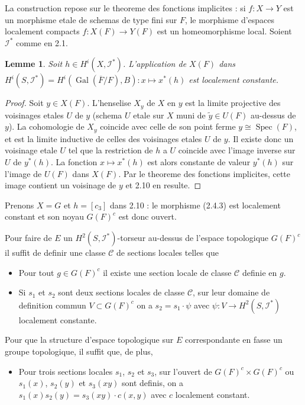 \documentclass[11pt,a4paper]{article}
\theoremstyle{plain}
\newtheorem{lemma}[theorem]{Lemme}
\theoremstyle{definition}
\DeclareMathOperator{\Gal}{Gal}
\DeclareMathOperator{\Spec}{Spec}
\begin{document}
La construction repose sur le theoreme des fonctions implicites : si $f : X \to Y$ est un morphisme etale de schemas de type fini sur $F$, le morphisme d'espaces localement compacts $f : X(F) \to Y(F)$ est un homeomorphisme local. Soient $\mathscr{I}^*$ comme en 2.1.

\begin{lemma}\label{2.10}
Soit $h \in H^i(X, \mathscr{I}^*)$. L'application de $X(F)$ dans $H^i(S, \mathscr{I}^*) = H^i(\Gal(\overline{F}/F), B) : x \mapsto x^*(h)$ est localement constante.
\end{lemma}

\begin{proof}
Soit $y \in X(F)$. L'henselise $X_y$ de $X$ en $y$ est la limite projective des voisinages etales $U$ de $y$ (schema $U$ etale sur $X$ muni de $\tilde{y} \in U(F)$ au-dessus de $y$). La cohomologie de $X_y$ coincide avec celle de son point ferme $y \cong \Spec(F)$, et est la limite inductive de celles des voisinages etales $U$ de $y$. Il existe donc un voisinage etale $U$ tel que la restriction de $h$ a $U$ coincide avec l'image inverse sur $U$ de $y^*(h)$. La fonction $x \mapsto x^*(h)$ est alors constante de valeur $y^*(h)$ sur l'image de $U(F)$ dans $X(F)$. Par le theoreme des fonctions implicites, cette image contient un voisinage de $y$ et 2.10 en resulte.
\end{proof}

Prenons $X = G$ et $h = [c_3]$ dans 2.10 : le morphisme (2.4.3) est localement constant et son noyau $G(F)^c$ est donc ouvert.

Pour faire de $E$ un $H^2(S, \mathscr{I}^*)$-torseur au-dessus de l'espace topologique $G(F)^c$ il suffit de definir une classe $\mathscr{C}$ de sections locales telles que
\begin{itemize}
\item[a)] Pour tout $g \in G(F)^c$ il existe une section locale de classe $\mathscr{C}$ definie en $g$.
\item[b)] Si $s_1$ et $s_2$ sont deux sections locales de classe $\mathscr{C}$, sur leur domaine de definition commun $V \subset G(F)^c$ on a $s_2 = s_1 \cdot \psi$ avec $\psi : V \to H^2(S, \mathscr{I}^*)$ localement constante.
\end{itemize}
Pour que la structure d'espace topologique sur $E$ correspondante en fasse un groupe topologique, il suffit que, de plus,
\begin{itemize}
\item[c)] Pour trois sections locales $s_1$, $s_2$ et $s_3$, sur l'ouvert de $G(F)^c \times G(F)^c$ ou $s_1(x)$, $s_2(y)$ et $s_3(xy)$ sont definis, on a $s_1(x) s_2(y) = s_3(xy) \cdot c(x,y)$ avec $c$ localement constant.
\end{itemize}
\end{document}
